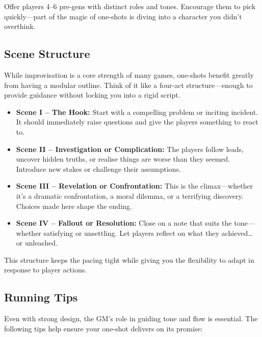 Offer players 4–6 pre-gens with distinct roles and tones. Encourage them to pick quickly—part of the magic of one-shots is diving into a character you didn’t overthink.

\subsection*{Scene Structure}

While improvisation is a core strength of many games, one-shots benefit greatly from having a modular outline. Think of it like a four-act structure—enough to provide guidance without locking you into a rigid script.

\begin{itemize}
    \item \textbf{Scene I – The Hook:} Start with a compelling problem or inciting incident. It should immediately raise questions and give the players something to react to.
    \item \textbf{Scene II – Investigation or Complication:} The players follow leads, uncover hidden truths, or realise things are worse than they seemed. Introduce new stakes or challenge their assumptions.
    \item \textbf{Scene III – Revelation or Confrontation:} This is the climax—whether it's a dramatic confrontation, a moral dilemma, or a terrifying discovery. Choices made here shape the ending.
    \item \textbf{Scene IV – Fallout or Resolution:} Close on a note that suits the tone—whether satisfying or unsettling. Let players reflect on what they achieved… or unleashed.
\end{itemize}

This structure keeps the pacing tight while giving you the flexibility to adapt in response to player actions.

\subsection*{Running Tips}

Even with strong design, the GM’s role in guiding tone and flow is essential. The following tips help ensure your one-shot delivers on its promise:

